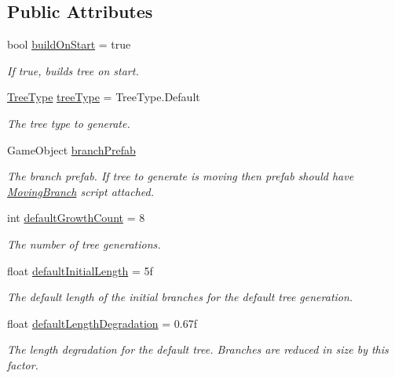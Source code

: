 \subsection*{Public Attributes}
\begin{DoxyCompactItemize}
\item 
bool \hyperlink{class_fractal_tree_1_1_tree_builder_a430c3374fd2e1302f232d08bca9558b2}{build\+On\+Start} = true
\begin{DoxyCompactList}\small\item\em If true, builds tree on start. \end{DoxyCompactList}\item 
\hyperlink{class_fractal_tree_1_1_tree_builder_a955d67cfa976440cc427e591be74f979}{Tree\+Type} \hyperlink{class_fractal_tree_1_1_tree_builder_aa2f66ebffbf59d18232884f85e95490d}{tree\+Type} = Tree\+Type.\+Default
\begin{DoxyCompactList}\small\item\em The tree type to generate. \end{DoxyCompactList}\item 
Game\+Object \hyperlink{class_fractal_tree_1_1_tree_builder_a3cc99e5fd404b3916dc29f5dc5223d8c}{branch\+Prefab}
\begin{DoxyCompactList}\small\item\em The branch prefab. If tree to generate is moving then prefab should have \hyperlink{interface_fractal_tree_1_1_moving_branch}{Moving\+Branch} script attached. \end{DoxyCompactList}\item 
int \hyperlink{class_fractal_tree_1_1_tree_builder_a6f7229c6652a8d52f4227f5e7dce3123}{default\+Growth\+Count} = 8
\begin{DoxyCompactList}\small\item\em The number of tree generations. \end{DoxyCompactList}\item 
float \hyperlink{class_fractal_tree_1_1_tree_builder_a34195cdf1a552ee1027bfbf42682ea29}{default\+Initial\+Length} = 5f
\begin{DoxyCompactList}\small\item\em The default length of the initial branches for the default tree generation. \end{DoxyCompactList}\item 
float \hyperlink{class_fractal_tree_1_1_tree_builder_aab288ec80d45e50e41a31ca3313e44be}{default\+Length\+Degradation} = 0.\+67f
\begin{DoxyCompactList}\small\item\em The length degradation for the default tree. Branches are reduced in size by this factor. \end{DoxyCompactList}\item 

\end{DoxyCompactItemize}
